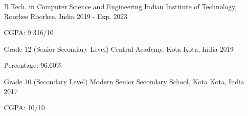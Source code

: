 

\begin{cventries}

  \cventry
    {B.Tech. in Computer Science and Engineering} %
    {Indian Institute of Technology, Roorkee} %
    {Roorkee, India} %
    {2019 - Exp. 2023} %
    {
      \begin{cvitems} %
        \item {CGPA: 9.316/10}
      \end{cvitems}
    }

  \cventry
    {Grade 12 (Senior Secondary Level)} %
    {Central Academy, Kota} %
    {Kota, India} %
    {2019} %
    {
      \begin{cvitems} %
        \item {Percentage: 96.60\%}
      \end{cvitems}
    }

  \cventry
    {Grade 10 (Secondary Level)} %
    {Modern Senior Secondary School, Kota} %
    {Kota, India} %
    {2017} %
    {
      \begin{cvitems} %
        \item {CGPA: 10/10}
      \end{cvitems}
    }

\end{cventries}
